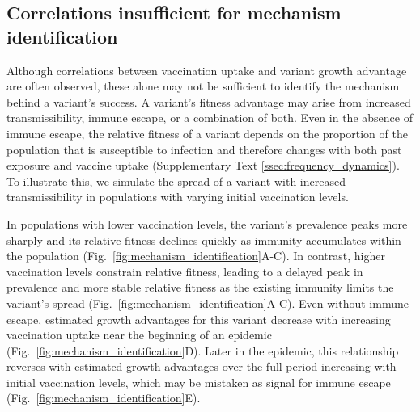 \documentclass[11pt,oneside,letterpaper]{article}
\begin{document}
\subsection*{Correlations insufficient for mechanism identification}

Although correlations between vaccination uptake and variant growth advantage are often observed, these alone may not be sufficient to identify the mechanism behind a variant's success.
A variant’s fitness advantage may arise from increased transmissibility, immune escape, or a combination of both.
Even in the absence of immune escape, the relative fitness of a variant depends on the proportion of the population that is susceptible to infection and therefore changes with both past exposure and vaccine uptake (Supplementary Text \ref{ssec:frequency_dynamics}).
To illustrate this, we simulate the spread of a variant with increased transmissibility in populations with varying initial vaccination levels.

In populations with lower vaccination levels, the variant’s prevalence peaks more sharply and its relative fitness declines quickly as immunity accumulates within the population (Fig.~\ref{fig:mechanism_identification}A-C).
In contrast, higher vaccination levels constrain relative fitness, leading to a delayed peak in prevalence and more stable relative fitness as the existing immunity limits the variant’s spread (Fig.~\ref{fig:mechanism_identification}A-C).
Even without immune escape, estimated growth advantages for this variant decrease with increasing vaccination uptake near the beginning of an epidemic (Fig.~\ref{fig:mechanism_identification}D).
Later in the epidemic, this relationship reverses with estimated growth advantages over the full period increasing with initial vaccination levels, which may be mistaken as signal for immune escape (Fig.~\ref{fig:mechanism_identification}E).
\end{document}
